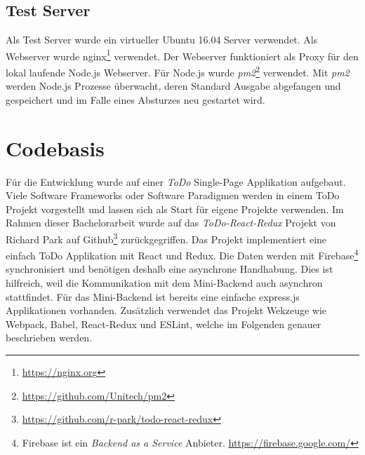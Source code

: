\subsection{Test Server}
Als Test Server wurde ein virtueller Ubuntu 16.04 Server verwendet. Als Webserver wurde nginx\footnote{\url{https://nginx.org}} verwendet. Der Webserver funktioniert als Proxy für den lokal laufende Node.js Webserver. Für Node.js wurde \textit{pm2}\footnote{\url{https://github.com/Unitech/pm2}} verwendet. Mit \textit{pm2} werden Node.js Prozesse überwacht, deren Standard Ausgabe abgefangen und gespeichert und im Falle eines Absturzes neu gestartet wird.

\section{Codebasis}
Für die Entwicklung wurde auf einer \textit{ToDo} Single-Page Applikation aufgebaut. Viele Software Frameworks oder Software Paradigmen werden in einem ToDo Projekt vorgestellt und lassen sich als Start für eigene Projekte verwenden. Im Rahmen dieser Bachelorarbeit wurde auf das \textit{ToDo-React-Redux} Projekt von Richard Park auf Github\footnote{\url{https://github.com/r-park/todo-react-redux}} zurückgegriffen. Das Projekt implementiert eine einfach ToDo Applikation mit React und Redux. Die Daten werden mit Firebase\footnote{Firebase ist ein \textit{Backend as a Service} Anbieter. \url{https://firebase.google.com/}} synchronisiert und benötigen deshalb eine asynchrone Handhabung. Dies ist hilfreich, weil die Kommunikation mit dem Mini-Backend auch asynchron stattfindet. Für das Mini-Backend ist bereits eine einfache express.js Applikationen vorhanden. Zusätzlich verwendet das Projekt Wekzeuge wie Webpack, Babel, React-Redux und ESLint, welche im Folgenden genauer beschrieben werden.

